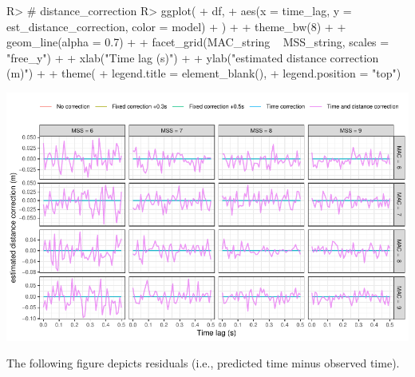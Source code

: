 \documentclass[
]{jss}
\begin{document}
\begin{CodeChunk}
\begin{CodeInput}
R> # distance_correction
R> ggplot(
+   df,
+   aes(x = time_lag, y = est_distance_correction, color = model)
+ ) +
+   theme_bw(8) +
+   geom_line(alpha = 0.7) +
+   facet_grid(MAC_string ~ MSS_string, scales = "free_y") +
+   xlab("Time lag (s)") +
+   ylab("estimated distance correction (m)") +
+   theme(
+     legend.title = element_blank(),
+     legend.position = "top")
\end{CodeInput}


\begin{center}\includegraphics[width=1\linewidth]{paper_files/figure-latex/unnamed-chunk-43-1} \end{center}

\end{CodeChunk}

The following figure depicts residuals (i.e., predicted time minus observed time).
\end{document}
